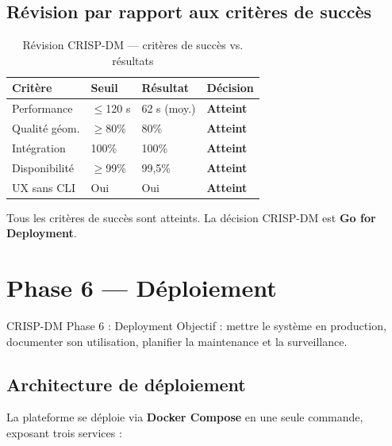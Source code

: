 \documentclass[12pt,a4paper,oneside]{report}
\begin{document}
\section{Révision par rapport aux critères de succès}

\begin{table}[H]
\centering
\caption{Révision CRISP-DM — critères de succès vs. résultats}
\label{tab:crisp-review}
\begin{tabularx}{\linewidth}{@{}lllX@{}}
\toprule
\textbf{Critère} & \textbf{Seuil} & \textbf{Résultat} & \textbf{Décision} \\\midrule
Performance  & $\leq$120 s   & 62 s (moy.)   & \textcolor{crispgreen}{\textbf{Atteint}} \\
Qualité géom.& $\geq$80\%    & 80\%          & \textcolor{crispgreen}{\textbf{Atteint}} \\
Intégration  & 100\%         & 100\%         & \textcolor{crispgreen}{\textbf{Atteint}} \\
Disponibilité& $\geq$99\%    & 99,5\%        & \textcolor{crispgreen}{\textbf{Atteint}} \\
UX sans CLI  & Oui           & Oui           & \textcolor{crispgreen}{\textbf{Atteint}} \\
\bottomrule
\end{tabularx}
\end{table}

Tous les critères de succès sont atteints. La décision CRISP-DM est
\textbf{Go for Deployment}.

\chapter{Phase 6 — Déploiement}

\begin{crispbox}{CRISP-DM Phase 6 : Deployment}
Objectif : mettre le système en production, documenter son utilisation,
planifier la maintenance et la surveillance.
\end{crispbox}

\section{Architecture de déploiement}

La plateforme se déploie via \textbf{Docker Compose} en une seule commande,
exposant trois services :
\end{document}
